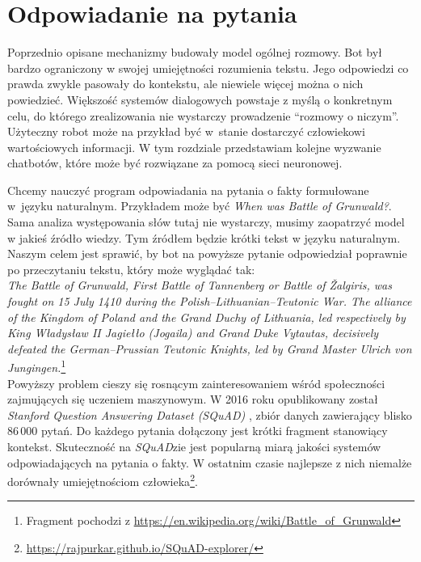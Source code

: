 
\setlength{\abovedisplayskip}{20pt}
\setlength{\belowdisplayskip}{20pt}

\chapter{Odpowiadanie na pytania} \label{rozdzial4}

Poprzednio opisane mechanizmy budowały model ogólnej rozmowy. Bot był bardzo ograniczony w swojej umiejętności rozumienia tekstu. Jego odpowiedzi co prawda zwykle pasowały do kontekstu, ale niewiele więcej można o nich powiedzieć. Większość systemów dialogowych powstaje z myślą o konkretnym celu, do którego zrealizowania nie wystarczy prowadzenie ``rozmowy o niczym''. Użyteczny robot może na przykład być w~stanie dostarczyć człowiekowi wartościowych informacji. W tym rozdziale przedstawiam kolejne wyzwanie chatbotów, które może być rozwiązane za pomocą sieci neuronowej.

Chcemy nauczyć program odpowiadania na pytania o fakty formułowane w~języku naturalnym. Przykładem może być \textit{When was Battle of Grunwald?}. Sama analiza występowania słów tutaj nie wystarczy, musimy zaopatrzyć model w jakieś źródło wiedzy. Tym źródłem będzie krótki tekst w języku naturalnym. Naszym celem jest sprawić, by bot na powyższe pytanie odpowiedział poprawnie po przeczytaniu tekstu, który może wyglądać tak:\\

\small\textit{The Battle of Grunwald, First Battle of Tannenberg or Battle of Žalgiris, was fought on 15 July 1410 during the Polish–Lithuanian–Teutonic War. The alliance of the Kingdom of Poland and the Grand Duchy of Lithuania, led respectively by King Władysław II Jagiełło (Jogaila) and Grand Duke Vytautas, decisively defeated the German–Prussian Teutonic Knights, led by Grand Master Ulrich von Jungingen.}\footnote{Fragment pochodzi z \url{https://en.wikipedia.org/wiki/Battle_of_Grunwald}}\\

\normalsize
Powyższy problem cieszy się rosnącym zainteresowaniem wśród społeczności zajmujących się uczeniem maszynowym. W 2016 roku opublikowany został \textit{Stanford Question Answering Dataset (SQuAD)} \cite{squaddata}, zbiór danych zawierający blisko 86\,000 pytań. Do każdego pytania dołączony jest krótki fragment stanowiący kontekst. Skuteczność na \textit{SQuAD}zie jest popularną miarą jakości systemów odpowiadających na pytania o fakty. W ostatnim czasie najlepsze z nich niemalże dorównały umiejętnościom człowieka\footnote{\url{https://rajpurkar.github.io/SQuAD-explorer/}}.

